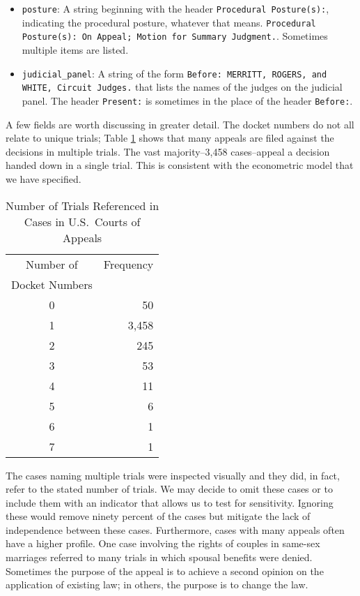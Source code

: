 \documentclass[11pt]{paper}
\begin{document}
\begin{itemize}
	\item \texttt{posture}: A string beginning with the header 
		\texttt{Procedural Posture(s):}, indicating the procedural posture, 
		whatever that means. 
		\texttt{Procedural Posture(s): On Appeal; Motion for Summary Judgment.}. 
		Sometimes multiple items are listed. 

	\item \texttt{judicial\_panel}: A string of the form 
		\texttt{Before: MERRITT, ROGERS, and WHITE, Circuit Judges.} 
		that lists the names of the judges on the judicial panel. 
		The header \texttt{Present:} is sometimes in the place of 
		the header \texttt{Before:}.  
		

\end{itemize}

A few fields are worth discussing in greater detail. 
The docket numbers do not all relate to unique trials;
Table \ref{tab:num_docket_numbers} shows that 
many appeals are filed against the decisions in multiple trials. 
The vast majority--3,458 cases--appeal a decision
handed down in a single trial. 
This is consistent with the econometric model that we have specified. 

% 
\begin{table}[ht]
\centering
\begin{tabular}{c r}
  \hline
	Number of 			& Frequency \\ 
	Docket Numbers 	&  \\ 
  \hline
	 0 							& 50 \\ 
	 1 							& 3,458 \\ 
	 2 							& 245 \\ 
	 3 							& 53 \\ 
	 4 							& 11 \\ 
	 5 							& 6 \\ 
	 6 							& 1 \\ 
	 7 							& 1 \\ 
   \hline
\end{tabular}
\caption{Number of Trials Referenced in Cases in U.S.~Courts of Appeals} 
\label{tab:num_docket_numbers}
\end{table}

The cases naming multiple trials were inspected visually
and they did, in fact, refer to the stated number of trials.
We may decide to omit these cases 
or to include them with an indicator 
that allows us to test for sensitivity. 
Ignoring these would remove ninety percent of the cases
but mitigate the lack of independence between these cases. 
Furthermore, cases with many appeals often have a higher profile. 
One case involving the rights of couples in same-sex marriages
referred to many trials in which spousal benefits were denied. 
Sometimes the purpose of the appeal is to achieve a second opinion on
the application of existing law;
in others, the purpose is to change the law. 
\end{document}
